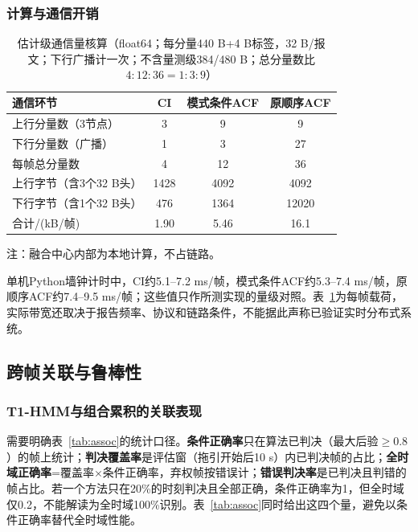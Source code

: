 \documentclass[UTF8,a4paper,zihao=-4]{ctexart}
\begin{document}
\subsubsection{计算与通信开销}\label{sec:cost}
\begin{table}[htbp]
\centering
\caption{估计级通信量核算（float64；每分量440 B+4 B标签，32 B/报文；下行广播计一次；不含量测级384/480 B；总分量数比$4:12:36=1:3:9$）}\label{tab:comm}
\small
\begin{tabular}{@{}lccc@{}}
\toprule
通信环节 & CI & 模式条件ACF & 原顺序ACF\\
\midrule
上行分量数（3节点） & 3 & 9 & 9\\
下行分量数（广播） & 1 & 3 & 27\\
每帧总分量数 & 4 & 12 & 36\\
上行字节（含3个32 B头） & 1428 & 4092 & 4092\\
下行字节（含1个32 B头） & 476 & 1364 & 12020\\
合计/(kB/帧) & 1.90 & 5.46 & 16.1\\
\bottomrule
\end{tabular}
\par\vspace{2pt}\footnotesize 注：融合中心内部为本地计算，不占链路。
\end{table}

单机Python墙钟计时中，CI约5.1--7.2 ms/帧，模式条件ACF约5.3--7.4 ms/帧，原顺序ACF约7.4--9.5 ms/帧；这些值只作所测实现的量级对照。表~\ref{tab:comm}为每帧载荷，实际带宽还取决于报告频率、协议和链路条件，不能据此声称已验证实时分布式系统。


\subsection{跨帧关联与鲁棒性}\label{sec:robustness}


\subsubsection{T1-HMM与组合累积的关联表现}\label{sec:association-results}
需要明确表~\ref{tab:assoc}的统计口径。\textbf{条件正确率}只在算法已判决（最大后验\(\ge0.8\)）的帧上统计；\textbf{判决覆盖率}是评估窗（拖引开始后10 s）内已判决帧的占比；\textbf{全时域正确率}=覆盖率\(\times\)条件正确率，弃权帧按错误计；\textbf{错误判决率}是已判决且判错的帧占比。若一个方法只在20\%的时刻判决且全部正确，条件正确率为1，但全时域仅0.2，不能解读为全时域100\%识别。表~\ref{tab:assoc}同时给出这四个量，避免以条件正确率替代全时域性能。
\end{document}
